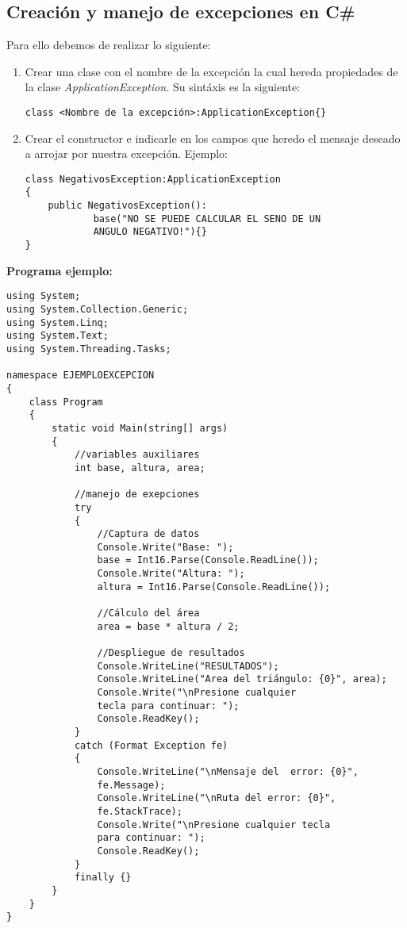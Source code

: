 \documentclass[letterpaper, 12pt]{article}
\begin{document}
\begin{justify}
        \subsection{Creación y manejo de excepciones en C\#}
        Para ello debemos de realizar lo siguiente:
        \begin{enumerate}
            \item Crear una clase con el nombre de la excepción la cual hereda propiedades de la clase \emph{ApplicationException.} Su sintáxis es la siguiente:
                \begin{verbatim}                    
class <Nombre de la excepción>:ApplicationException{}                \end{verbatim}
            \item Crear el constructor e indicarle en los campos que heredo el mensaje deseado a arrojar por nuestra excepción. Ejemplo:
                \begin{verbatim}
class NegativosException:ApplicationException
{
    public NegativosException():
            base("NO SE PUEDE CALCULAR EL SENO DE UN 
            ANGULO NEGATIVO!"){}
} \end{verbatim}
        \end{enumerate}
        \textbf{Programa ejemplo:}
                \begin{verbatim}
using System;
using System.Collection.Generic;
using System.Linq;
using System.Text;
using System.Threading.Tasks;

namespace EJEMPLOEXCEPCION
{
    class Program
    {
        static void Main(string[] args)
        {
            //variables auxiliares
            int base, altura, area;

            //manejo de exepciones
            try
            {
                //Captura de datos
                Console.Write("Base: ");
                base = Int16.Parse(Console.ReadLine());
                Console.Write("Altura: ");
                altura = Int16.Parse(Console.ReadLine());

                //Cálculo del área
                area = base * altura / 2;

                //Despliegue de resultados
                Console.WriteLine("RESULTADOS");
                Console.WriteLine("Area del triángulo: {0}", area);
                Console.Write("\nPresione cualquier 
                tecla para continuar: ");
                Console.ReadKey();
            }
            catch (Format Exception fe)
            {
                Console.WriteLine("\nMensaje del  error: {0}", 
                fe.Message);
                Console.WriteLine("\nRuta del error: {0}", 
                fe.StackTrace);
                Console.Write("\nPresione cualquier tecla 
                para continuar: ");
                Console.ReadKey();
            }
            finally {}
        }
    }
}
                \end{verbatim}
    \end{justify}
\end{document}
